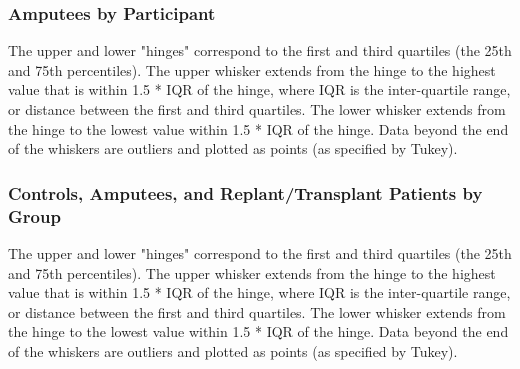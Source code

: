 \documentclass{beamer}
\begin{document}
\begin{frame}
\frametitle{Amputees by Participant}
\begin{figure}
\setlength{\fboxsep}{0pt}%
\setlength{\fboxrule}{1pt}%
\end{figure}
\tiny
The upper and lower "hinges" correspond to the first and third quartiles (the 25th and 75th percentiles). The upper whisker extends from the hinge to the highest value that is within 1.5 * IQR of the hinge, where IQR is the inter-quartile range, or distance between the first and third quartiles. The lower whisker extends from the hinge to the lowest value within 1.5 * IQR of the hinge. Data beyond the end of the whiskers are outliers and plotted as points (as specified by Tukey).
\end{frame}

\begin{frame}
\frametitle{Controls, Amputees, and Replant/Transplant Patients by Group}
\begin{figure}
\setlength{\fboxsep}{0pt}%
\setlength{\fboxrule}{1pt}%
\end{figure}
\tiny
The upper and lower "hinges" correspond to the first and third quartiles (the 25th and 75th percentiles). The upper whisker extends from the hinge to the highest value that is within 1.5 * IQR of the hinge, where IQR is the inter-quartile range, or distance between the first and third quartiles. The lower whisker extends from the hinge to the lowest value within 1.5 * IQR of the hinge. Data beyond the end of the whiskers are outliers and plotted as points (as specified by Tukey).
\end{frame}
\end{document}
